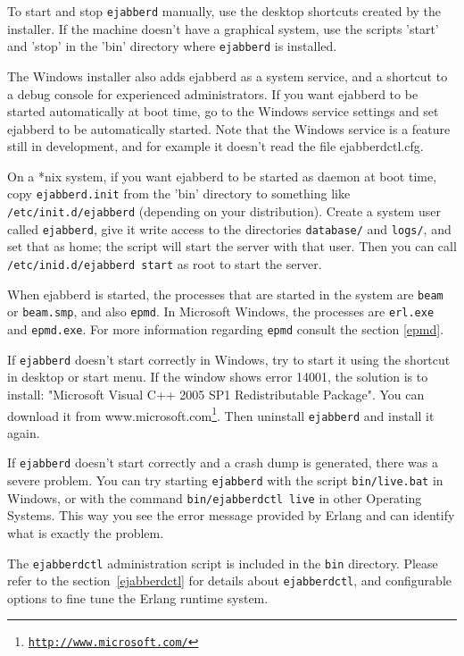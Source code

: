 \documentclass[a4paper,10pt]{book}
\newcommand{\term}[1]{\texttt{#1}}
\newcommand{\ejabberd}{\texttt{ejabberd}}
\gdef\footahref#1#2{#2\footnote{\href{#1}{\texttt{#1}}}}
\begin{document}
To start and stop \ejabberd{} manually,
use the desktop shortcuts created by the installer.
If the machine doesn't have a graphical system, use the scripts 'start'
and 'stop' in the 'bin' directory where \ejabberd{} is installed.

The Windows installer also adds ejabberd as a system service,
and a shortcut to a debug console for experienced administrators.
If you want ejabberd to be started automatically at boot time,
go to the Windows service settings and set ejabberd to be automatically started.
Note that the Windows service is a feature still in development,
and for example it doesn't read the file ejabberdctl.cfg.

On a *nix system, if you want ejabberd to be started as daemon at boot time,
copy \term{ejabberd.init} from the 'bin' directory to something like \term{/etc/init.d/ejabberd}
(depending on your distribution).
Create a system user called \term{ejabberd},
give it write access to the directories \term{database/} and \term{logs/}, and set that as home;
the script will start the server with that user.
Then you can call \term{/etc/inid.d/ejabberd start} as root to start the server.

When ejabberd is started, the processes that are started in the system
are \term{beam} or \term{beam.smp}, and also \term{epmd}.
In Microsoft Windows, the processes are \term{erl.exe} and \term{epmd.exe}.
For more information regarding \term{epmd} consult the section \ref{epmd}.

If \term{ejabberd} doesn't start correctly in Windows,
try to start it using the shortcut in desktop or start menu.
If the window shows error 14001, the solution is to install:
"Microsoft Visual C++ 2005 SP1 Redistributable Package".
You can download it from
\footahref{http://www.microsoft.com/}{www.microsoft.com}.
Then uninstall \ejabberd{} and install it again.

If \term{ejabberd} doesn't start correctly and a crash dump is generated,
there was a severe problem.
You can try starting \term{ejabberd} with
the script \term{bin/live.bat} in Windows,
or with the command \term{bin/ejabberdctl live} in other Operating Systems.
This way you see the error message provided by Erlang
and can identify what is exactly the problem.

The \term{ejabberdctl} administration script is included in the \term{bin} directory.
Please refer to the section~\ref{ejabberdctl} for details about \term{ejabberdctl},
and configurable options to fine tune the Erlang runtime system.
\end{document}

